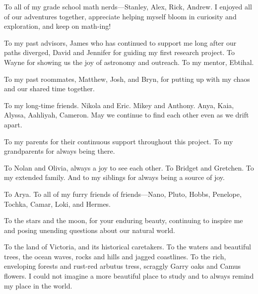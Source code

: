 To all of my grade school math nerds---Stanley, Alex, Rick, Andrew. I
enjoyed all of our adventures together, appreciate helping myself bloom
in curiosity and exploration, and keep on math-ing!

To my past advisors, James who has continued to support me long after
our paths diverged, David and Jennifer for guiding my first research
project. To Wayne for showing us the joy of astronomy and outreach. To
my mentor, Ebtihal.

To my past roommates, Matthew, Josh, and Bryn, for putting up with my
chaos and our shared time together.

To my long-time friends. Nikola and Eric. Mikey and Anthony. Anya, Kaia,
Alyssa, Aahliyah, Cameron. May we continue to find each other even as we
drift apart.

To my parents for their continuous support throughout this project. To
my grandparents for always being there.

To Nolan and Olivia, always a joy to see each other. To Bridget and
Gretchen. To my extended family. And to my siblings for always being a
source of joy.

To Arya. To all of my furry friends of friends---Nano, Pluto, Hobbs,
Penelope, Tochka, Camar, Loki, and Hermes.

To the stars and the moon, for your enduring beauty, continuing to
inspire me and posing unending questions about our natural world.

To the land of Victoria, and its historical caretakers. To the waters
and beautiful trees, the ocean waves, rocks and hills and jagged
coastlines. To the rich, enveloping forests and rust-red arbutus tress,
scraggly Garry oaks and Camus flowers. I could not imagine a more
beautiful place to study and to always remind my place in the world.
